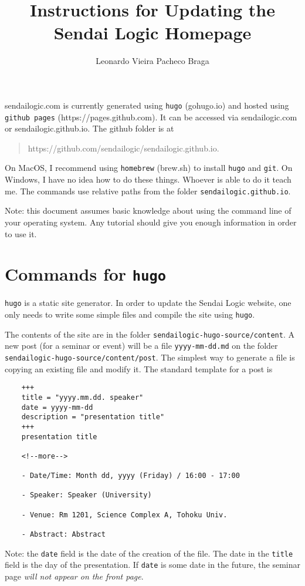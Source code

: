 \documentclass[a4paper]{article}
\title{Instructions for Updating the Sendai Logic Homepage}
\author{Leonardo Vieira Pacheco Braga}
\begin{document}
\maketitle

sendailogic.com is currently generated using \texttt{hugo} (gohugo.io) and hosted using \texttt{github pages} (https://pages.github.com).
It can be accessed via sendailogic.com or sendailogic.github.io.
The github folder is at
\begin{quote}
    https://github.com/sendailogic/sendailogic.github.io.
\end{quote}

On MacOS, I recommend using \texttt{homebrew} (brew.sh) to install \texttt{hugo} and \texttt{git}.
On Windows, {\color{red} I have no idea how to do these things. Whoever is able to do it teach me.}
The commands use relative paths from the folder \texttt{sendailogic.github.io}.

Note: this document assumes basic knowledge about using the command line of your operating system.
Any tutorial should give you enough information in order to use it.

\section{Commands for \texttt{hugo}}
\texttt{hugo} is a static site generator.
In order to update the Sendai Logic website, one only needs to write some simple files and compile the site using \texttt{hugo}.

The contents of the site are in the folder \texttt{sendailogic-hugo-source/content}.
A new post (for a seminar or event) will be a file \texttt{yyyy-mm-dd.md} on the folder \texttt{sendailogic-hugo-source/content/post}.
The simplest way to generate a file is copying an existing file and modify it.
The standard template for a post is
\begin{verbatim}
    +++
    title = "yyyy.mm.dd. speaker"
    date = yyyy-mm-dd
    description = "presentation title"
    +++
    presentation title

    <!--more-->

    - Date/Time: Month dd, yyyy (Friday) / 16:00 - 17:00

    - Speaker: Speaker (University)

    - Venue: Rm 1201, Science Complex A, Tohoku Univ.

    - Abstract: Abstract
\end{verbatim}
Note: the \texttt{date} field is the date of the creation of the file.
The date in the \texttt{title} field is the day of the presentation.
If \texttt{date} is some date in the future, the seminar page {\em will not appear on the front page}.
\end{document}
